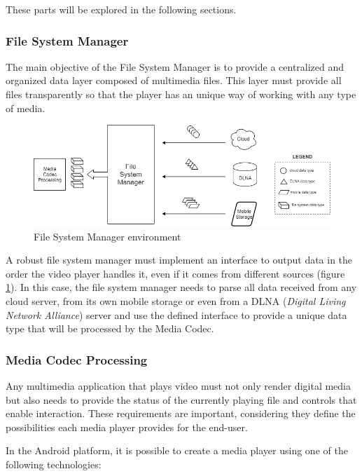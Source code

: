 \documentclass[runningheads]{llncs}
\begin{document}
These parts will be explored in the following sections.

\subsubsection{File System Manager}

The main objective of the File System Manager is to provide a centralized and organized data layer composed of multimedia files. This layer must provide all files transparently so that the player has an unique way of working with any type of media.

\begin{figure}[h!]
    \centerline{\includegraphics[scale=0.5]{images/file_system2.png}}
    \caption{File System Manager environment}
    \label{fig-file-system}
\end{figure}

A robust file system manager must implement an interface to output data in the order the video player handles it, even if it comes from different sources (figure \ref{fig-file-system}). In this case,
the file system manager needs to parse all data received from any cloud server, from its own mobile storage or even from a DLNA (\textit{Digital Living Network Alliance}) server and use the defined interface to provide a unique data type that will be processed by the Media Codec.

\subsubsection{Media Codec Processing}

Any multimedia application that plays video must not only render digital media but also needs to provide the status of the currently playing file and controls that enable interaction. These requirements are important, considering they define the possibilities each media player provides for the end-user.

In the Android platform, it is possible to create a media player using one of the following technologies:
\end{document}
